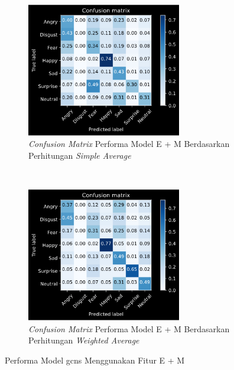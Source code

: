 \begin{figure}[t]
    \centering
    \begin{subfigure}[t]{6.75cm}
        \includegraphics[width=6.75cm]{gambar/eksperimen4b5_matriks1.png}
        \caption{\textit{Confusion Matrix} Performa Model E + M Berdasarkan Perhitungan \textit{Simple Average}}
        \label{fig:confusionmatrixeksperimen4b5}
    \end{subfigure}
    ~~~
    \begin{subfigure}[t]{6.75cm}
        \includegraphics[width=6.75cm]{gambar/eksperimen4b5_matriks2.png}
        \caption{\textit{Confusion Matrix} Performa Model E + M Berdasarkan Perhitungan \textit{Weighted Average}}
        \label{fig:confusionmatrixeksperimen4b5}
    \end{subfigure}
    \caption{Performa Model \acrshort{gcns} Menggunakan Fitur E + M}
    \label{fig:hasileksperimen4b5}
\end{figure}


